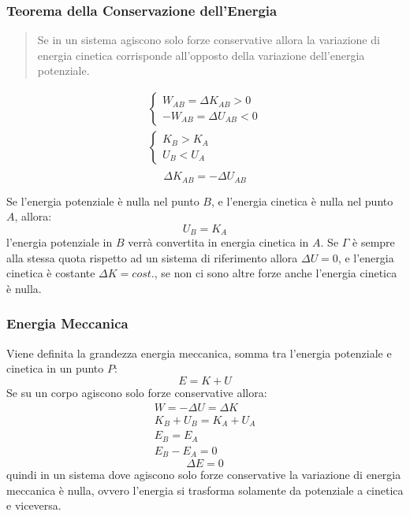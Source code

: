 \documentclass{article}
\numberwithin{equation}{subsection}
\begin{document}
\subsubsection{Teorema della Conservazione dell'Energia}
\begin{quotation}
    Se in un sistema agiscono solo forze conservative allora la variazione di energia cinetica corrisponde all'opposto della variazione dell'energia potenziale. 
\end{quotation}

\begin{gather*}
    \begin{cases}
       W_{AB}=\Delta K_{AB}>0\\
      -W_{AB}=\Delta U_{AB}<0
    \end{cases}\\
    \begin{cases}
        K_B>K_A\\
        U_B<U_A
     \end{cases}\\
\end{gather*}
\begin{equation}
    \Delta K_{AB}=-\Delta U_{AB}
\end{equation}

Se l'energia potenziale è nulla nel punto $B$, e l'energia cinetica 
è nulla nel punto $A$, allora:
\begin{equation}
    U_B=K_A
\end{equation}
l'energia potenziale in $B$ verrà convertita in energia cinetica in $A$.
Se $\Gamma$ è sempre alla stessa 
quota rispetto ad un sistema di riferimento allora $\Delta U=0$, 
e l'energia cinetica è costante $\Delta K = cost.$, se non ci sono 
altre forze anche l'energia cinetica è nulla.

\subsubsection{Energia Meccanica}
Viene definita la grandezza energia meccanica, somma tra 
l'energia potenziale e cinetica in un punto $P$:
\begin{equation}
    E=K+U
\end{equation}
Se su un corpo agiscono solo forze conservative allora:
\begin{gather*}
    W=-\Delta U = \Delta K\\    
    K_B+U_B=K_A+U_A\\
    E_B=E_A\\
    E_B-E_A=0
\end{gather*}
\begin{equation}
    \Delta E=0
\end{equation}
quindi in un sistema dove agiscono solo forze conservative la 
variazione di energia meccanica è nulla, ovvero l'energia si 
trasforma solamente da potenziale a cinetica e viceversa. 
\end{document}
